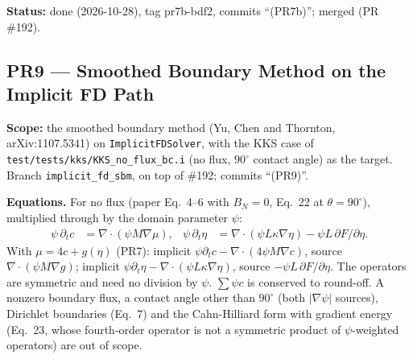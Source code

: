 \documentclass[11pt]{article}
\newcommand{\pr}[2]{\subsection{PR#1 --- #2}}
\newcommand{\status}[1]{\textcolor{marlinteal}{\textbf{Status:}} #1}
\begin{document}
\status{done (2026-10-28), tag pr7b-bdf2, commits ``(PR7b)''; merged (PR \#192).}

\pr{9}{Smoothed Boundary Method on the Implicit FD Path}
\textbf{Scope:} the smoothed boundary method (Yu, Chen and Thornton, arXiv:1107.5341) on
\texttt{ImplicitFDSolver}, with the KKS case of \texttt{test/tests/kks/KKS\_no\_flux\_bc.i}
(no flux, $90^\circ$ contact angle) as the target. Branch \texttt{implicit\_fd\_sbm}, on top of
\#192; commits ``(PR9)''.

\textbf{Equations.} For no flux (paper Eq.~4--6 with $B_N = 0$, Eq.~22 at $\theta = 90^\circ$),
multiplied through by the domain parameter $\psi$:
\begin{align*}
\psi\,\partial_t c &= \nabla\cdot(\psi M\nabla\mu), &
\psi\,\partial_t \eta &= \nabla\cdot(\psi L\kappa\nabla\eta) - \psi L\,\partial F/\partial\eta.
\end{align*}
With $\mu = 4c + g(\eta)$ (PR7): implicit $\psi\partial_t c - \nabla\cdot(4\psi M\nabla c)$, source
$\nabla\cdot(\psi M\nabla g)$; implicit $\psi\partial_t\eta - \nabla\cdot(\psi L\kappa\nabla\eta)$,
source $-\psi L\,\partial F/\partial\eta$. The operators are symmetric and need no division by
$\psi$. $\sum\psi c$ is conserved to round-off. A nonzero boundary flux, a contact angle
other than $90^\circ$ (both $|\nabla\psi|$ sources), Dirichlet boundaries (Eq.~7) and the
Cahn-Hilliard form with gradient energy (Eq.~23, whose fourth-order operator is not a
symmetric product of $\psi$-weighted operators) are out of scope.
\end{document}
